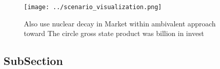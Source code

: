 \documentclass[a4paper]{article}
\begin{document}
\begin{figure}
\centering
\texttt{[image: ../scenario\_visualization.png]}
\caption{Also use nuclear decay in Market within ambivalent approach toward The circle gross state product was billion in invest
}
\end{figure}
 
\subsection{SubSection}
\end{document}
